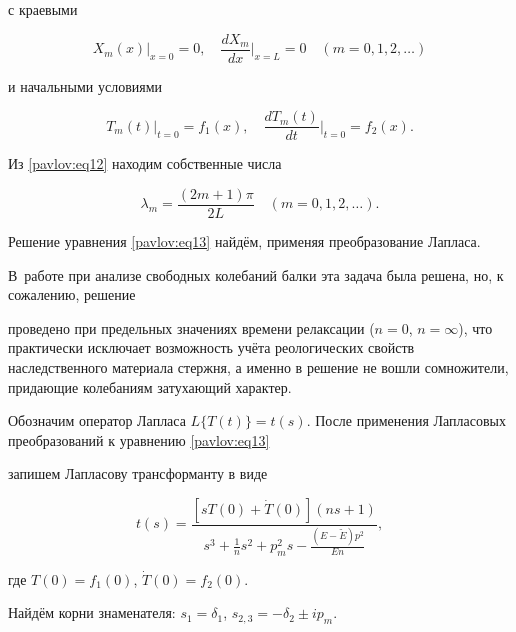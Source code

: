 с краевыми

\begin{equation}

\label{pavlov:eq14}

X_m (x) \Bigg |_{x=0} =0, \quad \frac{dX_m}{dx}\Bigg|_{x=L}=0 \quad (m=0, 1, 2, \ldots)

\end{equation}

и начальными условиями

\begin{equation}

\label{pavlov:eq15}

T_m (t) \big|_{t=0} = f_1 (x), \quad \frac{dT_m(t)}{dt} \Big|_{t=0} = f_2 (x).

\end{equation}

Из \eqref{pavlov:eq12} находим собственные числа

$$

\lambda _m =\frac{(2m+1)\pi }{2L} \quad (m=0, 1, 2, \ldots).

$$

Решение уравнения \eqref{pavlov:eq13} найдём, применяя преобразование Лапласа. 

В~работе \cite{pavlov:bib2} при анализе свободных колебаний балки эта задача была решена, но, к сожалению, решение

проведено при предельных значениях времени релаксации ($n=0$, $n=\infty$), что практически исключает возможность учёта реологических свойств наследственного материала стержня, а именно в решение не вошли сомножители, придающие колебаниям затухающий характер. 

Обозначим оператор Лапласа $L\{T(t)\}=t(s)$. После применения Лапласовых преобразований к уравнению \eqref{pavlov:eq13}

запишем Лапласову трансформанту в виде

\begin{equation}

\label{pavlov:eq16}

t(s)=\frac{[sT(0)+\dot {T}(0)]( ns+1)}{s^3+\frac{1}{n}s^2+p_m^2 s-\frac{(E-\tilde {E})p^2}{En}},

\end{equation}

где $T(0)=f_1 (0)$, $\dot {T}(0)=f_2 (0)$.



Найдём корни знаменателя: $s_1 =\delta _1 $, $s_{2,3} =-\delta _2 \pm ip_m $.

